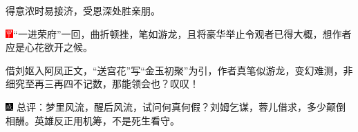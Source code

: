 得意浓时易接济，受恩深处胜亲朋。

{\includegraphics[width=3mm]{../Images/00002}“一进荣府”一回，曲折顿挫，笔如游龙，且将豪华举止令观者已得大概，想作者应是心花欲开之候。}

{借刘妪入阿凤正文，“送宫花”写“金玉初聚”为引，作者真笔似游龙，变幻难测，非细究至再三再四不记数，那能领会也？叹叹！}

{\includegraphics[width=3mm]{../Images/00005}  \kaishu 总评：梦里风流，醒后风流，试问何真何假？刘姆乞谋，蓉儿借求，多少颠倒相酬。英雄反正用机筹，不是死生看守。}




